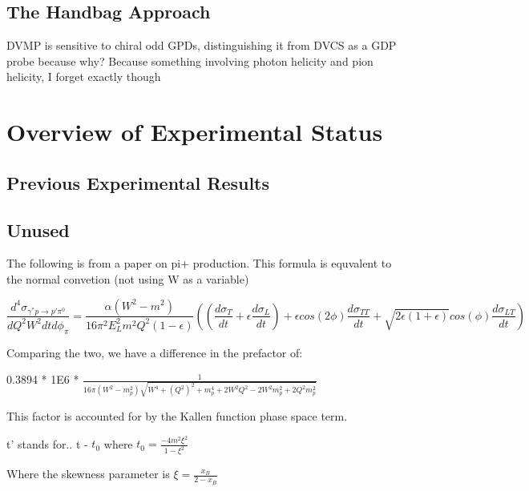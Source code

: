     \subsection{The Handbag Approach}


 DVMP is sensitive to chiral odd GPDs, distinguishing it from DVCS as a GDP probe because why? Because something involving photon helicity and pion helicity, I forget exactly though


\section{Overview of Experimental Status}
    \subsection{Previous Experimental Results}





\iffalse
    \subsection{Unused}
        The following is from a paper on pi+ production. This formula is equvalent to the normal convetion (not using W as a variable)
        
         \begin{equation}\label{xsec}
             \frac{d^4\sigma_{\gamma^*p \rightarrow p'\pi^0}}{dQ^2W^2dtd\phi_{\pi}} =
             \frac{\alpha (W^2-m^2)}{16\pi^2 E^2_L m^2 Q^2 (1-\epsilon)}
             ((\frac{d\sigma_T}{dt}+\epsilon\frac{d\sigma_L}{dt})+
             \epsilon cos(2\phi) \frac{d\sigma_{TT}}{dt} + \sqrt{2\epsilon(1+\epsilon)}cos(\phi)\frac{d\sigma_{LT}}{dt})
        \end{equation}
        
        Comparing the two, we have a difference in the prefactor of:
        
        0.3894 * 1E6 * $\frac{1}{16\pi(W^2-m_p^2)\sqrt{W^4 + (Q^2)^2+m_p^4+2W^2Q^2-2W^2m_p^2+2Q^2m_p^2}}$
        
        This factor is accounted for by the Kallen function phase space term.
        
        
        
        
        t' stands for.. t - $t_0$ where $t_0 = \frac{-4m^2\xi^2}{1-\xi^2}$
        
           Where the skewness parameter is $\xi = \frac{x_B}{2-x_B}$ 
           
